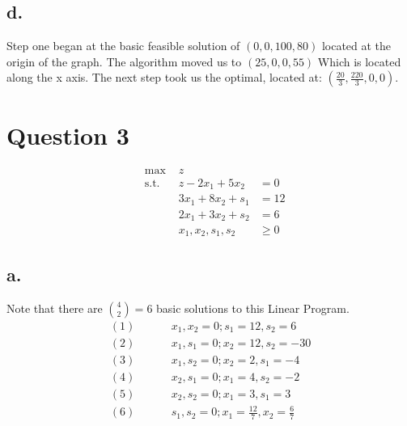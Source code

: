 \documentclass[10pt, letterpaper]{paper}
\begin{document}
\subsection*{d.}
Step one began at the basic feasible solution of $(0,0,100,80)$ located at the origin of the graph. The algorithm moved us to
$(25, 0, 0, 55)$ Which is located along the x axis. The next step took us the optimal, located at: $(\frac{20}{3},\frac{220}{3},0,0)$.

\section*{Question 3}

\begin{equation*}
\begin{alignedat}{3}
&\text{max }&z&\\
&\text{s.t. } &z - 2x_1 + 5x_2 &= 0 \\
& &3x_1 + 8x_2 + s_1 &= 12\\
& &2x_1 + 3x_2 + s_2 &= 6\\
& &x_1, x_2, s_1, s_2 &\geq 0
\end{alignedat}
\end{equation*}

\subsection*{a.} 
Note that there are ${4 \choose 2} = 6$ basic solutions to this Linear Program.
\begin{equation*}
\begin{alignedat}{2}
(1) \hspace{1cm}& x_1,x_2 = 0; s_1 = 12, s_2 = 6\\
(2) \hspace{1cm}& x_1,s_1 = 0; x_2 = 12, s_2 = -30\\
(3) \hspace{1cm}& x_1,s_2 = 0; x_2 = 2, s_1 = -4\\
(4) \hspace{1cm}& x_2,s_1 = 0; x_1 = 4, s_2 = -2\\
(5) \hspace{1cm}& x_2, s_2 = 0; x_1 = 3, s_1 = 3\\
(6) \hspace{1cm}& s_1, s_2 = 0; x_1 = \frac{12}{7}, x_2 = \frac{6}{7}
\end{alignedat}
\end{equation*}
\end{document}
